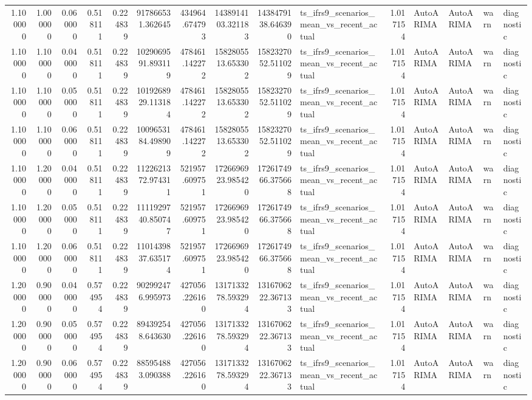 \begin{tabular}{rrrrrrrrrlrllll}
1.100000 & 1.000000 & 0.060000 & 0.518111 & 0.224839 & 917866531.362645 & 434964.674793 & 1438914103.321183 & 1438479138.646390 & ts_ifrs9_scenarios_mean_vs_recent_actual & 1.017154 & AutoARIMA & AutoARIMA & warn & diagnostic \\
1.100000 & 1.100000 & 0.040000 & 0.518111 & 0.224839 & 1029069591.893119 & 478461.142272 & 1582805513.653302 & 1582327052.511029 & ts_ifrs9_scenarios_mean_vs_recent_actual & 1.017154 & AutoARIMA & AutoARIMA & warn & diagnostic \\
1.100000 & 1.100000 & 0.050000 & 0.518111 & 0.224839 & 1019268929.113184 & 478461.142272 & 1582805513.653302 & 1582327052.511029 & ts_ifrs9_scenarios_mean_vs_recent_actual & 1.017154 & AutoARIMA & AutoARIMA & warn & diagnostic \\
1.100000 & 1.100000 & 0.060000 & 0.518111 & 0.224839 & 1009653184.498909 & 478461.142272 & 1582805513.653302 & 1582327052.511029 & ts_ifrs9_scenarios_mean_vs_recent_actual & 1.017154 & AutoARIMA & AutoARIMA & warn & diagnostic \\
1.100000 & 1.200000 & 0.040000 & 0.518111 & 0.224839 & 1122621372.974311 & 521957.609751 & 1726696923.985420 & 1726174966.375668 & ts_ifrs9_scenarios_mean_vs_recent_actual & 1.017154 & AutoARIMA & AutoARIMA & warn & diagnostic \\
1.100000 & 1.200000 & 0.050000 & 0.518111 & 0.224839 & 1111929740.850747 & 521957.609751 & 1726696923.985420 & 1726174966.375668 & ts_ifrs9_scenarios_mean_vs_recent_actual & 1.017154 & AutoARIMA & AutoARIMA & warn & diagnostic \\
1.100000 & 1.200000 & 0.060000 & 0.518111 & 0.224839 & 1101439837.635174 & 521957.609751 & 1726696923.985420 & 1726174966.375668 & ts_ifrs9_scenarios_mean_vs_recent_actual & 1.017154 & AutoARIMA & AutoARIMA & warn & diagnostic \\
1.200000 & 0.900000 & 0.040000 & 0.574954 & 0.224839 & 902992476.995973 & 427056.226160 & 1317133278.593294 & 1316706222.367133 & ts_ifrs9_scenarios_mean_vs_recent_actual & 1.017154 & AutoARIMA & AutoARIMA & warn & diagnostic \\
1.200000 & 0.900000 & 0.050000 & 0.574954 & 0.224839 & 894392548.643630 & 427056.226160 & 1317133278.593294 & 1316706222.367133 & ts_ifrs9_scenarios_mean_vs_recent_actual & 1.017154 & AutoARIMA & AutoARIMA & warn & diagnostic \\
1.200000 & 0.900000 & 0.060000 & 0.574954 & 0.224839 & 885954883.090388 & 427056.226160 & 1317133278.593294 & 1316706222.367133 & ts_ifrs9_scenarios_mean_vs_recent_actual & 1.017154 & AutoARIMA & AutoARIMA & warn & diagnostic \\

\end{tabular}
